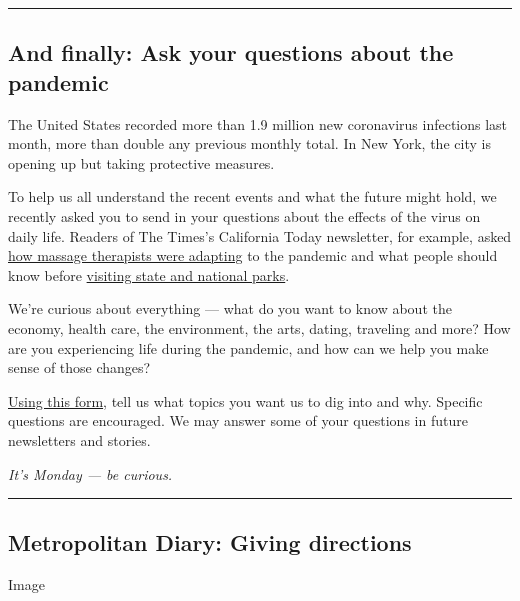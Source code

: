 \begin{center}\rule{0.5\linewidth}{\linethickness}\end{center}

\hypertarget{and-finally-ask-your-questions-about-the-pandemic}{%
\subsection{And finally: Ask your questions about the
pandemic}\label{and-finally-ask-your-questions-about-the-pandemic}}

The United States recorded more than 1.9 million new coronavirus
infections last month, more than double any previous monthly total. In
New York, the city is opening up but taking protective measures.

To help us all understand the recent events and what the future might
hold, we recently asked you to send in your questions about the effects
of the virus on daily life. Readers of The Times's California Today
newsletter, for example, asked
\href{https://www.nytimes.com/2020/07/31/us/essential-workers-massage-therapists.html}{how
massage therapists were adapting} to the pandemic and what people should
know before
\href{https://www.nytimes.com/2020/07/13/us/california-parks-coronavirus.html}{visiting
state and national parks}.

We're curious about everything --- what do you want to know about the
economy, health care, the environment, the arts, dating, traveling and
more? How are you experiencing life during the pandemic, and how can we
help you make sense of those changes?

\href{https://www.nytimes.com/2019/09/17/reader-center/coronavirus-nyc-questions.html}{Using
this form}, tell us what topics you want us to dig into and why.
Specific questions are encouraged. We may answer some of your questions
in future newsletters and stories.

\emph{It's Monday --- be curious.}

\begin{center}\rule{0.5\linewidth}{\linethickness}\end{center}

\hypertarget{metropolitan-diary-giving-directions}{%
\subsection{Metropolitan Diary: Giving
directions}\label{metropolitan-diary-giving-directions}}

Image

